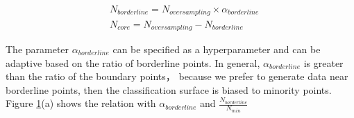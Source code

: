 \documentclass[runningheads]{llncs}
\begin{document}
\begin{equation}
  \label{equation2}
\begin{aligned}
  & N_{borderline}=N_{oversampling}\times \alpha_{borderline} \\
  & N_{core}=N_{oversampling}-N_{borderline}
\end{aligned}
\end{equation}

\begin{figure}[htbp]
  \centering
  \quad
  \caption{}
  \label{fig20}
  \end{figure}

The parameter $\alpha_{borderline}$ can be specified as a 
hyperparameter and can be adaptive based on the ratio of borderline points.
In general, $\alpha_{borderline}$ is greater than the ratio of the boundary points，
because we prefer to generate data near borderline points,
then the classification surface is biased to minority points.
Figure \ref{fig20}(a) shows the relation with $\alpha_{borderline}$ and $\frac{N_{borderline}}{N_{min}}$
\end{document}
